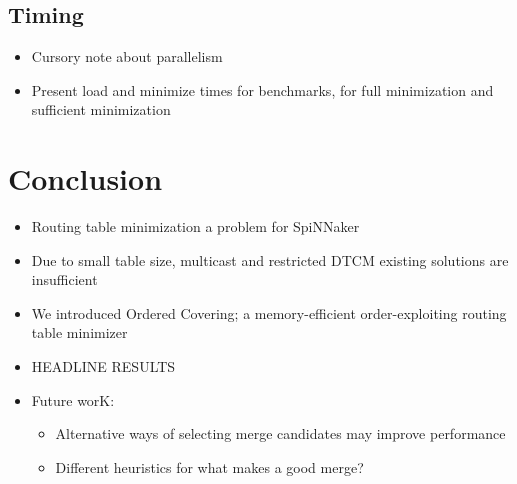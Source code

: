 \documentclass[conference]{IEEEtran}
\begin{document}
  \subsection{Timing}

  \begin{itemize}
    \item Cursory note about parallelism
    \item Present load and minimize times for benchmarks, for full minimization and sufficient minimization
  \end{itemize}

    

  \section{Conclusion}

  \begin{itemize}
    \item Routing table minimization a problem for SpiNNaker
    \item Due to small table size, multicast and restricted DTCM existing solutions are insufficient
    \item We introduced Ordered Covering; a memory-efficient order-exploiting routing table minimizer
    \item HEADLINE RESULTS
    \item Future worK:
      \begin{itemize}
        \item Alternative ways of selecting merge candidates may improve performance
        \item Different heuristics for what makes a good merge?
      \end{itemize}
  \end{itemize}

\printbibliography
\end{document}
